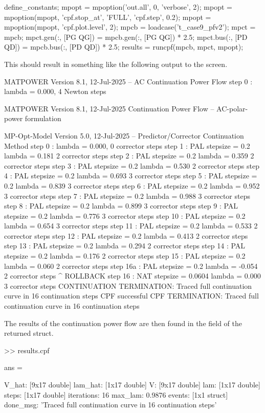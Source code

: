 \documentclass[12pt]{article}
\newcommand{\code}[1]{{\relsize{-0.5}{\tt{{#1}}}}}  %
\newcommand{\results}[0]{\code{results}}
\numberwithin{equation}{section}
\numberwithin{table}{section}
\numberwithin{figure}{section}
\begin{document}
\begin{Code}
define_constants;
mpopt = mpoption('out.all', 0, 'verbose', 2);
mpopt = mpoption(mpopt, 'cpf.stop_at', 'FULL', 'cpf.step', 0.2);
mpopt = mpoption(mpopt, 'cpf.plot.level', 2);
mpcb = loadcase('t_case9_pfv2');                    %
mpct = mpcb;                                        %
mpct.gen(:, [PG QG]) = mpcb.gen(:, [PG QG]) * 2.5;  %
mpct.bus(:, [PD QD]) = mpcb.bus(:, [PD QD]) * 2.5;  %
results = runcpf(mpcb, mpct, mpopt);
\end{Code}
This should result in something like the following output to the screen.
\begin{Code}
MATPOWER Version 8.1, 12-Jul-2025 -- AC Continuation Power Flow
step   0  :                      lambda =  0.000,  4 Newton steps

MATPOWER Version 8.1, 12-Jul-2025
Continuation Power Flow -- AC-polar-power formulation

MP-Opt-Model Version 5.0, 12-Jul-2025 -- Predictor/Corrector Continuation Method
step   0  :                          lambda =  0.000,  0 corrector steps
step   1  : PAL stepsize = 0.2       lambda =  0.181   2 corrector steps
step   2  : PAL stepsize = 0.2       lambda =  0.359   2 corrector steps
step   3  : PAL stepsize = 0.2       lambda =  0.530   2 corrector steps
step   4  : PAL stepsize = 0.2       lambda =  0.693   3 corrector steps
step   5  : PAL stepsize = 0.2       lambda =  0.839   3 corrector steps
step   6  : PAL stepsize = 0.2       lambda =  0.952   3 corrector steps
step   7  : PAL stepsize = 0.2       lambda =  0.988   3 corrector steps
step   8  : PAL stepsize = 0.2       lambda =  0.899   3 corrector steps
step   9  : PAL stepsize = 0.2       lambda =  0.776   3 corrector steps
step  10  : PAL stepsize = 0.2       lambda =  0.654   3 corrector steps
step  11  : PAL stepsize = 0.2       lambda =  0.533   2 corrector steps
step  12  : PAL stepsize = 0.2       lambda =  0.413   2 corrector steps
step  13  : PAL stepsize = 0.2       lambda =  0.294   2 corrector steps
step  14  : PAL stepsize = 0.2       lambda =  0.176   2 corrector steps
step  15  : PAL stepsize = 0.2       lambda =  0.060   2 corrector steps
step  16a : PAL stepsize = 0.2       lambda = -0.054   2 corrector steps ^ ROLLBACK
step  16  : NAT stepsize = 0.0604    lambda =  0.000   3 corrector steps
CONTINUATION TERMINATION: Traced full continuation curve in 16 continuation steps
CPF successful
CPF TERMINATION: Traced full continuation curve in 16 continuation steps
\end{Code}
The results of the continuation power flow are then found in the \code{cpf} field of the returned \results{} struct.
\begin{Code}
>> results.cpf

ans = 

         V_hat: [9x17 double]
       lam_hat: [1x17 double]
             V: [9x17 double]
           lam: [1x17 double]
         steps: [1x17 double]
    iterations: 16
       max_lam: 0.9876
        events: [1x1 struct]
      done_msg: 'Traced full continuation curve in 16 continuation steps'
\end{Code}
\end{document}
